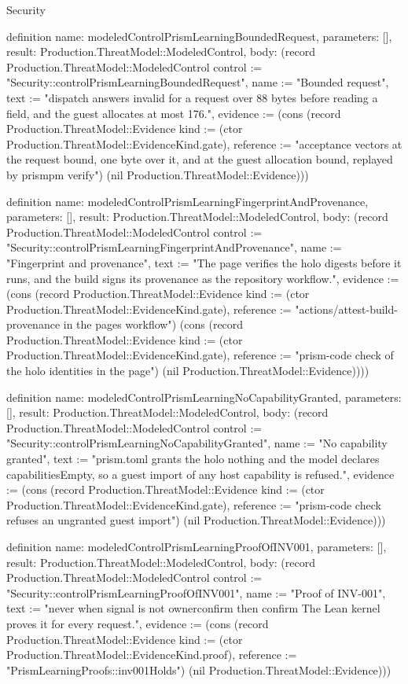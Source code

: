 \begin{lexlean}{Security}
\begin{semanticmodule}
definition{
  name: modeledControlPrismLearningBoundedRequest,
  parameters: [],
  result: Production.ThreatModel::ModeledControl,
  body: (record Production.ThreatModel::ModeledControl {control := "Security::controlPrismLearningBoundedRequest", name := "Bounded request", text := "dispatch answers invalid for a request over 88 bytes before reading a field, and the guest allocates at most 176.", evidence := (cons (record Production.ThreatModel::Evidence {kind := (ctor Production.ThreatModel::EvidenceKind.gate), reference := "acceptance vectors at the request bound, one byte over it, and at the guest allocation bound, replayed by prismpm verify"}) (nil Production.ThreatModel::Evidence))})
}

definition{
  name: modeledControlPrismLearningFingerprintAndProvenance,
  parameters: [],
  result: Production.ThreatModel::ModeledControl,
  body: (record Production.ThreatModel::ModeledControl {control := "Security::controlPrismLearningFingerprintAndProvenance", name := "Fingerprint and provenance", text := "The page verifies the holo digests before it runs, and the build signs its provenance as the repository workflow.", evidence := (cons (record Production.ThreatModel::Evidence {kind := (ctor Production.ThreatModel::EvidenceKind.gate), reference := "actions/attest-build-provenance in the pages workflow"}) (cons (record Production.ThreatModel::Evidence {kind := (ctor Production.ThreatModel::EvidenceKind.gate), reference := "prism-code check of the holo identities in the page"}) (nil Production.ThreatModel::Evidence)))})
}

definition{
  name: modeledControlPrismLearningNoCapabilityGranted,
  parameters: [],
  result: Production.ThreatModel::ModeledControl,
  body: (record Production.ThreatModel::ModeledControl {control := "Security::controlPrismLearningNoCapabilityGranted", name := "No capability granted", text := "prism.toml grants the holo nothing and the model declares capabilitiesEmpty, so a guest import of any host capability is refused.", evidence := (cons (record Production.ThreatModel::Evidence {kind := (ctor Production.ThreatModel::EvidenceKind.gate), reference := "prism-code check refuses an ungranted guest import"}) (nil Production.ThreatModel::Evidence))})
}

definition{
  name: modeledControlPrismLearningProofOfINV001,
  parameters: [],
  result: Production.ThreatModel::ModeledControl,
  body: (record Production.ThreatModel::ModeledControl {control := "Security::controlPrismLearningProofOfINV001", name := "Proof of INV-001", text := "never when signal is not ownerconfirm then confirm The Lean kernel proves it for every request.", evidence := (cons (record Production.ThreatModel::Evidence {kind := (ctor Production.ThreatModel::EvidenceKind.proof), reference := "PrismLearningProofs::inv001Holds"}) (nil Production.ThreatModel::Evidence))})
}


\end{semanticmodule}
\end{lexlean}
